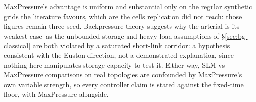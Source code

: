 

MaxPressure's advantage is uniform and substantial only on the
regular synthetic grids the literature favours, which are the cells
replication did not reach: those figures remain three-seed.
Backpressure theory suggests why the arterial is its weakest case, as the
unbounded-storage and heavy-load assumptions of \S\ref{sec:bg-classical}
\cite{gregoire2014backpressure,gregoire2014routing} are both violated by a
saturated short-link corridor: a hypothesis consistent with
the Euston direction, not a demonstrated explanation, since nothing here
manipulates storage capacity to test it. Either way, SLM-vs-MaxPressure
comparisons on real topologies are confounded by MaxPressure's own
variable strength, so every controller claim is stated against the
fixed-time floor, with MaxPressure alongside.

